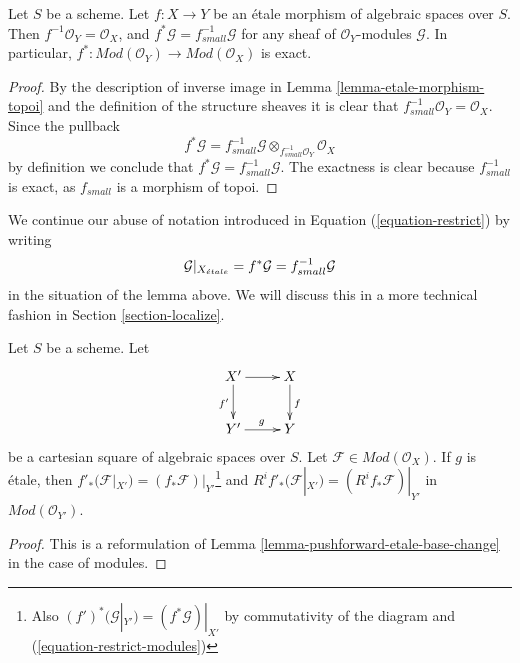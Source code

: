 \begin{lemma}
\label{lemma-etale-exact-pullback}
Let $S$ be a scheme.
Let $f : X \to Y$ be an \'etale morphism of algebraic spaces over $S$.
Then $f^{-1}\mathcal{O}_Y = \mathcal{O}_X$, and
$f^*\mathcal{G} = f_{small}^{-1}\mathcal{G}$ for any sheaf of
$\mathcal{O}_Y$-modules $\mathcal{G}$. In particular,
$f^* : \textit{Mod}(\mathcal{O}_Y) \to \textit{Mod}(\mathcal{O}_X)$
is exact.
\end{lemma}

\begin{proof}
By the description of inverse image in Lemma \ref{lemma-etale-morphism-topoi}
and the definition of the structure sheaves it is clear that
$f_{small}^{-1}\mathcal{O}_Y = \mathcal{O}_X$. Since the pullback
$$
f^*\mathcal{G} =
f_{small}^{-1}\mathcal{G} \otimes_{f_{small}^{-1}\mathcal{O}_Y}
\mathcal{O}_X
$$
by definition we conclude that $f^*\mathcal{G} = f_{small}^{-1}\mathcal{G}$.
The exactness is clear because $f_{small}^{-1}$ is exact, as $f_{small}$
is a morphism of topoi.
\end{proof}

\noindent
We continue our abuse of notation introduced in
Equation (\ref{equation-restrict})
by writing
\begin{equation}
\label{equation-restrict-modules}
\mathcal{G}|_{X_{\acute{e}tale}}
= f^*\mathcal{G}
= f_{small}^{-1}\mathcal{G}
\end{equation}
in the situation of the lemma above. We will discuss this in a more
technical fashion in
Section \ref{section-localize}.

\begin{lemma}
\label{lemma-pushforward-etale-base-change-modules}
Let $S$ be a scheme. Let
$$
\xymatrix{
X' \ar[r] \ar[d]_{f'} & X \ar[d]^f \\
Y' \ar[r]^g & Y
}
$$
be a cartesian square of algebraic spaces over $S$. Let
$\mathcal{F} \in \textit{Mod}(\mathcal{O}_X)$. If $g$ is \'etale, then
$f'_*(\mathcal{F}|_{X'}) = (f_*\mathcal{F})|_{Y'}$\footnote{Also
$(f')^*(\mathcal{G}|_{Y'}) = (f^*\mathcal{G})|_{X'}$
by commutativity of the diagram and (\ref{equation-restrict-modules})} and
$R^if'_*(\mathcal{F}|_{X'}) = (R^if_*\mathcal{F})|_{Y'}$ in
$\textit{Mod}(\mathcal{O}_{Y'})$.
\end{lemma}

\begin{proof}
This is a reformulation of
Lemma \ref{lemma-pushforward-etale-base-change}
in the case of modules.
\end{proof}

